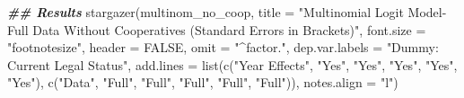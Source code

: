 \documentclass[a4paper,nobind]{templates/ociamthesis}
\newenvironment{Shaded}{\begin{snugshade}}{\end{snugshade}}
\newcommand{\AttributeTok}[1]{\textcolor[rgb]{0.77,0.63,0.00}{#1}}
\newcommand{\ConstantTok}[1]{\textcolor[rgb]{0.00,0.00,0.00}{#1}}
\newcommand{\DocumentationTok}[1]{\textcolor[rgb]{0.56,0.35,0.01}{\textbf{\textit{#1}}}}
\newcommand{\FunctionTok}[1]{\textcolor[rgb]{0.00,0.00,0.00}{#1}}
\newcommand{\NormalTok}[1]{#1}
\newcommand{\StringTok}[1]{\textcolor[rgb]{0.31,0.60,0.02}{#1}}
\renewenvironment{Shaded}
{
  \vspace{10pt}%
  \begin{snugshade}%
}{%
  \end{snugshade}%
  \vspace{8pt}%
}
\begin{document}
\begin{Shaded}
\begin{Highlighting}[]
\DocumentationTok{\#\# Results }
\FunctionTok{stargazer}\NormalTok{(multinom\_no\_coop, }\AttributeTok{title =} \StringTok{"Multinomial Logit Model{-} Full Data Without Cooperatives (Standard Errors in Brackets)"}\NormalTok{, }\AttributeTok{font.size =} \StringTok{"footnotesize"}\NormalTok{, }\AttributeTok{header =} \ConstantTok{FALSE}\NormalTok{, }\AttributeTok{omit =} \StringTok{"\^{}factor."}\NormalTok{, }\AttributeTok{dep.var.labels =} \StringTok{"Dummy: Current Legal Status"}\NormalTok{, }\AttributeTok{add.lines =} \FunctionTok{list}\NormalTok{(}\FunctionTok{c}\NormalTok{(}\StringTok{"Year Effects"}\NormalTok{, }\StringTok{"Yes"}\NormalTok{, }\StringTok{"Yes"}\NormalTok{, }\StringTok{"Yes"}\NormalTok{, }\StringTok{"Yes"}\NormalTok{, }\StringTok{"Yes"}\NormalTok{), }\FunctionTok{c}\NormalTok{(}\StringTok{"Data"}\NormalTok{, }\StringTok{"Full"}\NormalTok{, }\StringTok{"Full"}\NormalTok{, }\StringTok{"Full"}\NormalTok{, }\StringTok{"Full"}\NormalTok{, }\StringTok{"Full"}\NormalTok{)), }\AttributeTok{notes.align =} \StringTok{"l"}\NormalTok{)}
\end{Highlighting}
\end{Shaded}
\end{document}
